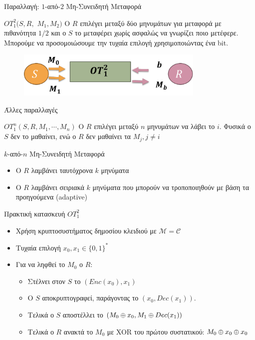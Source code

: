 \documentclass{beamer}
\begin{document}
\begin{frame}{Παραλλαγή: $1$-από-$2$ Μη-Συνειδητή Μεταφορά}
\begin{block}{$OT_1^2(S,R,$ $M_1,M_2)$}
	O $R$ επιλέγει μεταξύ δύο μηνυμάτων για μεταφορά με πιθανότητα ${1}/{2}$ και ο $S$ το μεταφέρει χωρίς ασφαλώς  να γνωρίζει ποιο μετέφερε. Μπορούμε να προσομοιώσουμε την τυχαία επιλογή χρησιμοποιώντας ένα bit.
\end{block}
\begin{figure}
	\centering
	\includegraphics[width=0.8\textwidth]{ot12.png}
\end{figure}
\end{frame}

\begin{frame}{Άλλες παραλλαγές}
	\begin{block}{$OT_1^n(S,R,M_1,\cdots,M_n)$}
		O $R$ επιλέγει μεταξύ $n$ μηνυμάτων να λάβει το $i$. Φυσικά ο $S$ δεν το μαθαίνει, ενώ ο $R$ δεν μαθαίνει τα $M_j, j \neq i$
	\end{block}	

	$k$-από-$n$ Μη-Συνειδητή Μεταφορά
	\begin{itemize}
			\item O $R$ λαμβάνει ταυτόχρονα $k$ μηνύματα
			\item O $R$ λαμβάνει σειριακά $k$ μηνύματα που μπορούν να τροποποιηθούν με βάση τα προηγούμενα (adaptive)
	\end{itemize}
\end{frame} 

\begin{frame}{Πρακτική κατασκευή $OT_1^2$}
	\begin{itemize}
	\item Χρήση κρυπτοσυστήματος δημοσίου κλειδιού με $\mathcal{M} = \mathcal{C}$
	\item Τυχαία επιλογή  $x_0, x_1 \in \{0,1\}^*$ 
	\item Για να ληφθεί το $M_0$ ο $R$:
	\begin{itemize}
		\item Στέλνει στον $S$ το $(Enc(x_0),x_1)$
		\item Ο $S$ αποκρυπτογραφεί, παράγοντας το $(x_0, Dec(x_1))$.  
		\item Τελικά ο $S$ αποστέλλει το $(M_0 \oplus x_0, M_1 \oplus Dec(x_1))$
		\item Τελικά ο $R$ ανακτά το $M_0$ με XOR του πρώτου συστατικού: $M_0 \oplus x_0 \oplus x_0$
	\end{itemize}
	\end{itemize}
\end{frame}
\end{document}
